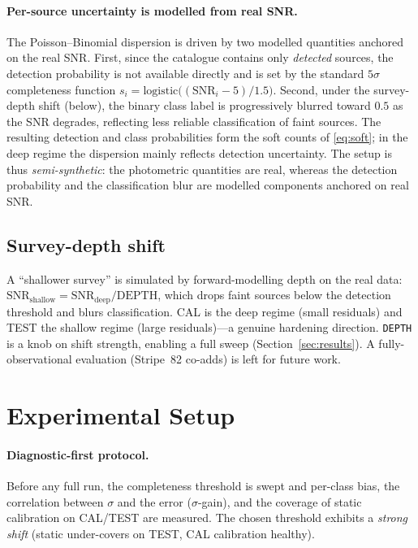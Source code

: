 \documentclass[pdflatex,sn-mathphys-num]{sn-jnl}%
\begin{document}
\paragraph{Per-source uncertainty is modelled from real SNR.} The Poisson--Binomial dispersion is driven by
two modelled quantities anchored on the real SNR. First, since the catalogue contains only \emph{detected}
sources, the detection probability is not available directly and is set by the standard $5\sigma$
completeness function $s_i=\mathrm{logistic}\big((\mathrm{SNR}_i-5)/1.5\big)$. Second, under the survey-depth
shift (below), the binary class label is progressively blurred toward $0.5$ as the SNR degrades, reflecting
less reliable classification of faint sources. The resulting detection and class probabilities form the soft
counts of \eqref{eq:soft}; in the deep regime the dispersion mainly reflects detection uncertainty. The
setup is thus \emph{semi-synthetic}: the photometric quantities are real, whereas the detection probability
and the classification blur are modelled components anchored on real SNR.

\subsection{Survey-depth shift}
A ``shallower survey'' is simulated by forward-modelling depth on the real data:
$\mathrm{SNR}_{\mathrm{shallow}}=\mathrm{SNR}_{\mathrm{deep}}/\mathrm{DEPTH}$, which drops faint sources
below the detection threshold and blurs classification. CAL is the deep regime (small residuals) and TEST
the shallow regime (large residuals)---a genuine hardening direction. \texttt{DEPTH} is a knob on shift
strength, enabling a full sweep (Section~\ref{sec:results}). A fully-observational evaluation (Stripe~82
co-adds) is left for future work.

\section{Experimental Setup}\label{sec:setup}

\paragraph{Diagnostic-first protocol.} Before any full run, the completeness threshold is swept and
per-class bias, the correlation between $\sigma$ and the error ($\sigma$-gain), and the coverage of static
calibration on CAL/TEST are measured. The chosen threshold exhibits a \emph{strong shift} (static
under-covers on TEST, CAL calibration healthy).
\end{document}
